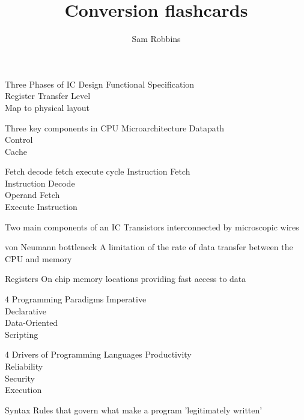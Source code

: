 \documentclass[grid,avery5371]{flashcards}
\title{Conversion flashcards}
\author{Sam Robbins}
\begin{document}
\begin{flashcard}[]{Three Phases of IC Design}
Functional Specification\\
Register Transfer Level\\
Map to physical layout
\end{flashcard}


\begin{flashcard}[]{Three key components in CPU Microarchitecture}
	Datapath\\
	Control\\
	Cache
\end{flashcard}

\begin{flashcard}[]{Fetch decode fetch execute cycle}
	Instruction Fetch\\
	Instruction Decode\\
	Operand Fetch\\
	Execute Instruction
\end{flashcard}

\begin{flashcard}[]{Two main components of an IC}
	Transistors interconnected by microscopic wires
\end{flashcard}

\begin{flashcard}[]{von Neumann bottleneck}
	A limitation of the rate of data transfer between the CPU and memory
\end{flashcard}

\begin{flashcard}[]{Registers}
	On chip memory locations providing fast access to data
\end{flashcard}

\begin{flashcard}[]{4 Programming Paradigms}
	Imperative\\
	Declarative\\
	Data-Oriented\\
	Scripting
\end{flashcard}

\begin{flashcard}[]{4 Drivers of Programming Languages}
	Productivity\\
	Reliability\\
	Security\\
	Execution
\end{flashcard}

\begin{flashcard}[]{Syntax}
	Rules that govern what make a program 'legitimately written'
\end{flashcard}
\end{document}
